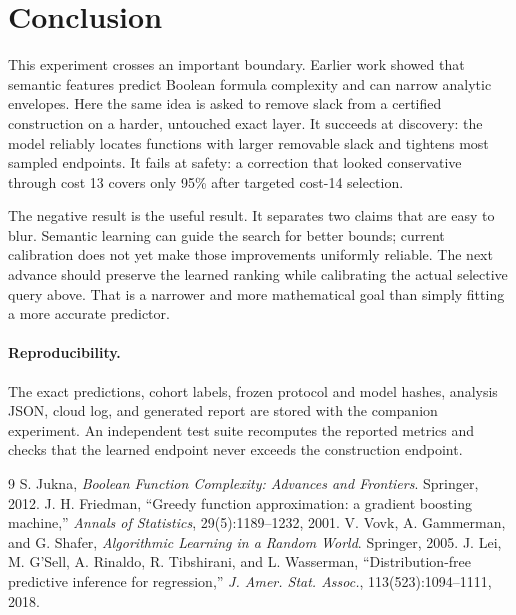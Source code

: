 \documentclass[11pt]{article}
\begin{document}
\section{Conclusion}

This experiment crosses an important boundary.  Earlier work showed that
semantic features predict Boolean formula complexity and can narrow analytic
envelopes.  Here the same idea is asked to remove slack from a certified
construction on a harder, untouched exact layer.  It succeeds at discovery:
the model reliably locates functions with larger removable slack and tightens
most sampled endpoints.  It fails at safety: a correction that looked
conservative through cost 13 covers only 95\% after targeted cost-14
selection.

The negative result is the useful result.  It separates two claims that are
easy to blur.  Semantic learning can guide the search for better bounds;
current calibration does not yet make those improvements uniformly reliable.
The next advance should preserve the learned ranking while calibrating the
actual selective query above.  That is a narrower and more mathematical
goal than simply fitting a more accurate predictor.

\paragraph{Reproducibility.}
The exact predictions, cohort labels, frozen protocol and model hashes,
analysis JSON, cloud log, and generated report are stored with the companion
experiment.  An independent test suite recomputes the reported metrics and
checks that the learned endpoint never exceeds the construction endpoint.

\begingroup
\footnotesize
\setlength{\parskip}{0pt}
\begin{thebibliography}{9}
\setlength{\itemsep}{0pt}
S. Jukna, \emph{Boolean Function Complexity: Advances and Frontiers}.
Springer, 2012.
J. H. Friedman, ``Greedy function approximation: a gradient boosting
machine,'' \emph{Annals of Statistics}, 29(5):1189--1232, 2001.
V. Vovk, A. Gammerman, and G. Shafer, \emph{Algorithmic Learning in a Random
World}. Springer, 2005.
J. Lei, M. G'Sell, A. Rinaldo, R. Tibshirani, and L. Wasserman,
``Distribution-free predictive inference for regression,''
\emph{J. Amer. Stat. Assoc.}, 113(523):1094--1111, 2018.
\end{thebibliography}
\endgroup
\end{document}

